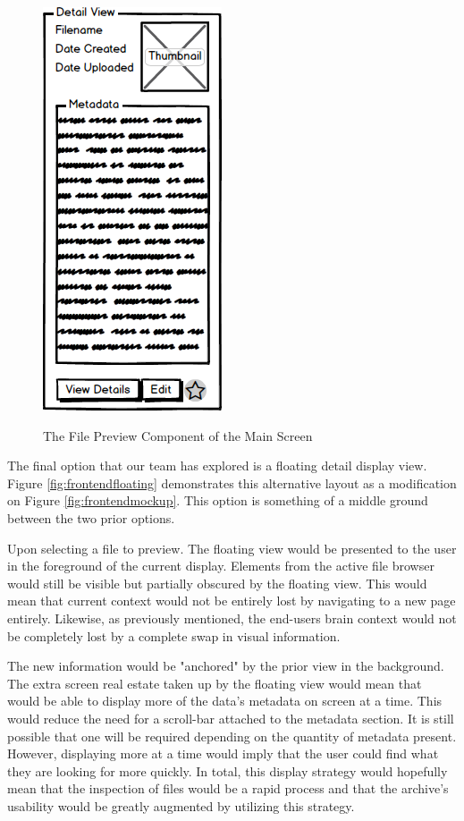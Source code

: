 \documentclass[12pt]{report}
\begin{document}
\begin{figure}[h]
	\centering
	\caption{The File Preview Component of the Main Screen}
	\includegraphics[scale=0.5]{frontend_file_preview}
	\label{fig:frontendfilepreview}
\end{figure}

The final option that our team has explored is a floating detail display view. Figure \ref{fig:frontendfloating} demonstrates this alternative layout as a modification on Figure \ref{fig:frontendmockup}. This option is something of a middle ground between the two prior options.

Upon selecting a file to preview. The floating view would be presented to the user in the foreground of the current display. Elements from the active file browser would still be visible but partially obscured by the floating view. This would mean that current context would not be entirely lost by navigating to a new page entirely. Likewise, as previously mentioned, the end-users brain context would not be completely lost by a complete swap in visual information.

The new information would be "anchored" by the prior view in the background. The extra screen real estate taken up by the floating view would mean that would be able to display more of the data's metadata on screen at a time. This would reduce the need for a scroll-bar attached to the metadata section. It is still possible that one will be required depending on the quantity of metadata present. However, displaying more at a time would imply that the user could find what they are looking for more quickly. In total, this display strategy would hopefully mean that the inspection of files would be a rapid process and that the archive's usability would be greatly augmented by utilizing this strategy.
\end{document}
